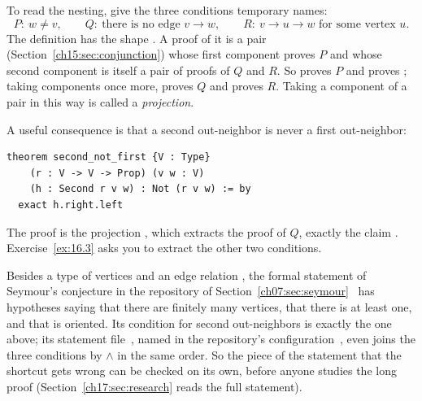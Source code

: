 To read the nesting, give the three conditions temporary names:
\[
 P:\ w\ne v,\qquad Q:\ \text{there is no edge }v\to w,\qquad
 R:\ v\to u\to w\text{ for some vertex }u.
\]
The definition has the shape . A proof  of it is a pair (Section~\ref{ch15:sec:conjunction}) whose first component proves $P$ and whose second component is itself a pair of proofs of $Q$ and $R$. So  proves $P$ and  proves ; taking components once more,  proves $Q$ and  proves $R$. Taking a component of a pair in this way is called a \emph{projection}.


A useful consequence is that a second out-neighbor is never a first out-neighbor:
\par\noindent\begin{minipage}{\linewidth}
\begin{lstlisting}
theorem second_not_first {V : Type}
    (r : V -> V -> Prop) (v w : V)
    (h : Second r v w) : Not (r v w) := by
  exact h.right.left
\end{lstlisting}
\end{minipage}\par
The proof is the projection , which extracts the proof of $Q$, exactly the claim . Exercise~\ref{ex:16.3} asks you to extract the other two conditions.

Besides a type  of vertices and an edge relation , the formal statement of Seymour's conjecture in the repository of Section~\ref{ch07:sec:seymour}~\cite{oai173} has hypotheses saying that there are finitely many vertices, that there is at least one, and that  is oriented. Its condition for second out-neighbors is exactly the one above; its statement file~\cite{oaistatement}, named in the repository's configuration~\cite{oaiconfig}, even joins the three conditions by $\land$ in the same order. So the piece of the statement that the shortcut gets wrong can be checked on its own, before anyone studies the long proof (Section~\ref{ch17:sec:research} reads the full statement).
